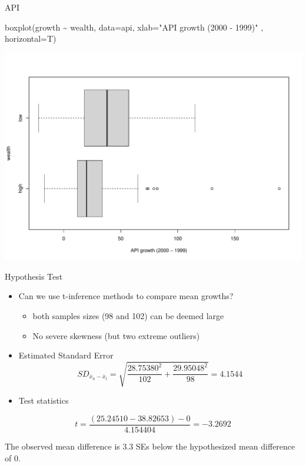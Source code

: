 \documentclass[
  10pt,
  ignorenonframetext,
]{beamer}
\newenvironment{Shaded}{\begin{snugshade}}{\end{snugshade}}
\newcommand{\AttributeTok}[1]{\textcolor[rgb]{0.77,0.63,0.00}{#1}}
\newcommand{\FunctionTok}[1]{\textcolor[rgb]{0.00,0.00,0.00}{#1}}
\newcommand{\NormalTok}[1]{#1}
\newcommand{\SpecialCharTok}[1]{\textcolor[rgb]{0.00,0.00,0.00}{#1}}
\newcommand{\StringTok}[1]{\textcolor[rgb]{0.31,0.60,0.02}{#1}}
\providecommand{\tightlist}{%
  \setlength{\itemsep}{0pt}\setlength{\parskip}{0pt}}
\let\oldShaded\Shaded
\let\endoldShaded\endShaded
\renewenvironment{Shaded}{\tiny\oldShaded}{\endoldShaded}
\begin{document}
\begin{frame}[fragile]{API}
\protect\hypertarget{api}{}
\begin{Shaded}
\begin{Highlighting}[]
\FunctionTok{boxplot}\NormalTok{(growth }\SpecialCharTok{\textasciitilde{}}\NormalTok{ wealth, }\AttributeTok{data=}\NormalTok{api, }\AttributeTok{xlab=}\StringTok{"API growth (2000 {-} 1999)"}\NormalTok{ , }\AttributeTok{horizontal=}\NormalTok{T)}
\end{Highlighting}
\end{Shaded}

\includegraphics{Day1_files/figure-beamer/unnamed-chunk-9-1.pdf}
\end{frame}

\begin{frame}{Hypothesis Test}
\protect\hypertarget{hypothesis-test}{}
\begin{itemize}
\item
  Can we use t-inference methods to compare mean growths?

  \begin{itemize}
  \tightlist
  \item
    both samples sizes (98 and 102) can be deemed large
  \item
    No severe skewness (but two extreme outliers)
  \end{itemize}
\item
  Estimated Standard Error \[
  SD_{\bar{x}_h - \bar{x}_l} = \sqrt{\dfrac{28.75380^2}{102} + \dfrac{29.95048^2}{98}} = 4.1544
  \]
\item
  Test statistics
\end{itemize}

\[
t = \dfrac{(25.24510 - 38.82653) - 0}{4.154404} = -3.2692
\]

The observed mean difference is 3.3 SEs below the hypothesized mean
difference of 0.
\end{frame}
\end{document}
